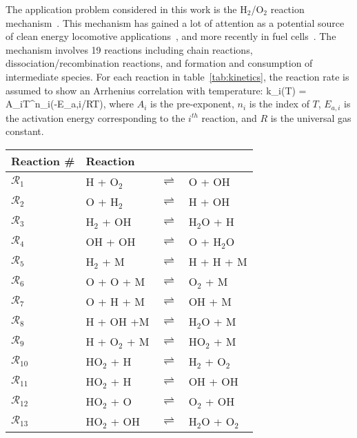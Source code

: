 The application problem considered in this work is the
H$_2$/O$_2$ reaction mechanism~\cite{Yetter:1991}. This mechanism has gained
a lot of attention as a potential source of clean energy
locomotive applications~\cite{Das:1996}, and more recently in fuel cells~\cite{Loges:2008}. 
The mechanism involves 19
reactions including chain reactions, dissociation/recombination reactions, and
formation and consumption of intermediate species. For each reaction in
table~\ref{tab:kinetics}, the reaction rate is assumed to show an Arrhenius
correlation with temperature:
%
\be
k_i(T) = A_iT^{n_i}\exp(-E_{a,i}/RT), 
\label{eq:rate}
\ee
%
where $A_i$ is the pre-exponent, $n_i$ is the index of $T$, $E_{a,i}$ is the
activation energy corresponding to the $i^{th}$ reaction, and $R$ is the
universal gas constant.  

\begin{table}[htbp]
\renewcommand*{\arraystretch}{0.9}
\begin{center}
\begin{tabular}{llll}
\toprule
Reaction \#     & Reaction &&\\
\bottomrule
$\mathcal{R}_1$ & H + O$_2$          & $\rightleftharpoons$ & O + OH \\
$\mathcal{R}_2$ & O + H$_2$          & $\rightleftharpoons$ & H + OH \\
$\mathcal{R}_3$ & H$_2$ + OH         & $\rightleftharpoons$ & H$_2$O + H \\
$\mathcal{R}_4$ & OH + OH            & $\rightleftharpoons$ & O + H$_2$O \\
$\mathcal{R}_5$ & H$_2$ + M          & $\rightleftharpoons$ & H + H + M \\
$\mathcal{R}_6$ & O + O + M          & $\rightleftharpoons$ & O$_2$ + M \\
$\mathcal{R}_7$ & O + H + M          & $\rightleftharpoons$ & OH + M \\
$\mathcal{R}_8$ & H + OH +M          & $\rightleftharpoons$ & H$_2$O + M \\
$\mathcal{R}_9$ & H + O$_2$ + M      & $\rightleftharpoons$ & HO$_2$ + M \\
$\mathcal{R}_{10}$ & HO$_2$ + H      & $\rightleftharpoons$ & H$_2$ + O$_2$ \\
$\mathcal{R}_{11}$ & HO$_2$ + H      & $\rightleftharpoons$ & OH + OH \\
$\mathcal{R}_{12}$ & HO$_2$ + O      & $\rightleftharpoons$ & O$_2$ + OH \\
$\mathcal{R}_{13}$ & HO$_2$ + OH     & $\rightleftharpoons$ & H$_2$O + O$_2$ \\

\end{tabular}
\end{center}
\end{table}
